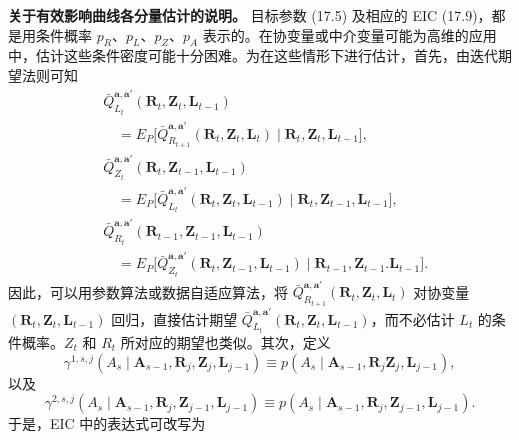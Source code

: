 \noindent\textbf{关于有效影响曲线各分量估计的说明。}
目标参数 (17.5) 及相应的 EIC (17.9)，都是用条件概率 $p_R$、$p_L$、$p_Z$、$p_A$ 表示的。在协变量或中介变量可能为高维的应用中，估计这些条件密度可能十分困难。为在这些情形下进行估计，首先，由迭代期望法则可知
\begin{equation}
\begin{aligned}
 &\bar Q_{L_t}^{\mathbf a,\mathbf a'}(\mathbf R_t,\mathbf Z_t,\mathbf L_{t-1})\\
 &\quad=E_P\bigl[\bar Q_{R_{t+1}}^{\mathbf a,\mathbf a'}(\mathbf R_t,\mathbf Z_t,\mathbf L_t)
 \mid\mathbf R_t,\mathbf Z_t,\mathbf L_{t-1}\bigr],\\
 &\bar Q_{Z_t}^{\mathbf a,\mathbf a'}(\mathbf R_t,\mathbf Z_{t-1},\mathbf L_{t-1})\\
 &\quad=E_P\bigl[\bar Q_{L_t}^{\mathbf a,\mathbf a'}(\mathbf R_t,\mathbf Z_t,\mathbf L_{t-1})
 \mid\mathbf R_t,\mathbf Z_{t-1},\mathbf L_{t-1}\bigr],\\
 &\bar Q_{R_t}^{\mathbf a,\mathbf a'}(\mathbf R_{t-1},\mathbf Z_{t-1},\mathbf L_{t-1})\\
 &\quad=E_P\bigl[\bar Q_{Z_t}^{\mathbf a,\mathbf a'}(\mathbf R_t,\mathbf Z_{t-1},\mathbf L_{t-1})
 \mid\mathbf R_{t-1},\mathbf Z_{t-1}.\mathbf L_{t-1}\bigr].
\end{aligned}
\tag{17.13}
\end{equation}
因此，可以用参数算法或数据自适应算法，将 $\bar Q_{R_{t+1}}^{\mathbf a,\mathbf a'}(\mathbf R_t,\mathbf Z_t,\mathbf L_t)$ 对协变量 $(\mathbf R_t,\mathbf Z_t,\mathbf L_{t-1})$ 回归，直接估计期望 $\bar Q_{L_t}^{\mathbf a,\mathbf a'}(\mathbf R_t,\mathbf Z_t,\mathbf L_{t-1})$，而不必估计 $L_t$ 的条件概率。$Z_t$ 和 $R_t$ 所对应的期望也类似。其次，定义
\[
 \gamma^{1,s,j}(A_s\mid\mathbf A_{s-1},\mathbf R_j,\mathbf Z_j,\mathbf L_{j-1})
 \equiv p(A_s\mid\mathbf A_{s-1},\mathbf R_j\mathbf Z_j,\mathbf L_{j-1}),
\]
以及
\[
 \gamma^{2,s,j}(A_s\mid\mathbf A_{s-1},\mathbf R_j,\mathbf Z_{j-1},\mathbf L_{j-1})
 \equiv p(A_s\mid\mathbf A_{s-1},\mathbf R_j,\mathbf Z_{j-1},\mathbf L_{j-1}).
\]
于是，EIC 中的表达式可改写为
